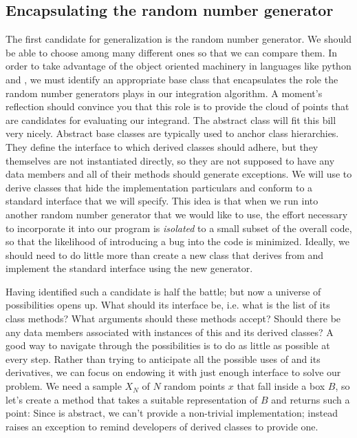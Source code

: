 \subsection{Encapsulating the random number generator}
\label{sec:classes:pointcloud}

The first candidate for generalization is the random number generator. We should be able to
choose among many different ones so that we can compare them. In order to take advantage of the
object oriented machinery in languages like python and \cpp, we must identify an appropriate
base class that encapsulates the role the random number generators plays in our integration
algorithm. A moment's reflection should convince you that this role is to provide the cloud of
points that are candidates for evaluating our integrand. The abstract class 
will fit this bill very nicely. Abstract base classes are typically used to anchor class
hierarchies. They define the interface to which derived classes should adhere, but they
themselves are not instantiated directly, so they are not supposed to have any data members and
all of their methods should generate exceptions. We will use  to derive
classes that hide the implementation particulars and conform to a standard interface that we
will specify.  This idea is that when we run into another random number generator that we would
like to use, the effort necessary to incorporate it into our program is {\em isolated} to a
small subset of the overall code, so that the likelihood of introducing a bug into the code is
minimized.  Ideally, we should need to do little more than create a new class that derives from
 and implement the standard interface using the new generator.

Having identified such a candidate is half the battle; but now a universe of possibilities
opens up. What should its interface be, i.e. what is the list of its class methods? What
arguments should these methods accept? Should there be any data members associated with
instances of this and its derived classes? A good way to navigate through the possibilities is
to do as little as possible at every step. Rather than trying to anticipate all the possible
uses of  and its derivatives, we can focus on endowing it with just enough
interface to solve our problem. We need a sample $X_{N}$ of $N$ random points $x$ that fall inside
a box $B$, so let's create a method  that takes a suitable representation of $B$
and returns such a point:
%
%
Since  is abstract, we can't provide a non-trivial implementation; instead
 raises an exception to remind developers of derived classes to provide one.

